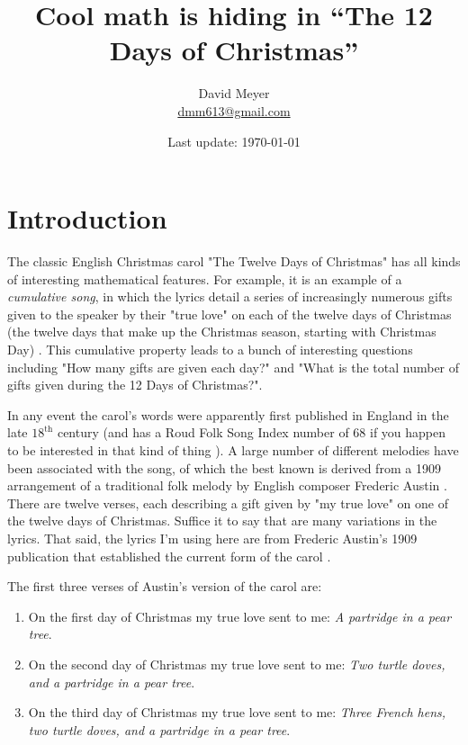 \documentclass{article}
\title{Cool math is hiding in ``The 12 Days of Christmas''}
\author{David Meyer \\ \href{mailto:dmm613@gmail.com}
                            {dmm613@gmail.com}}
\date{Last update: \today}
\theoremstyle{definition}
\begin{document}
\maketitle
%
%
%
\section{Introduction}
\label{sec:introduction}
The classic English Christmas carol "The Twelve Days of
Christmas" has all kinds of interesting mathematical
features. For example, it is an example of a \emph{cumulative
song}, in which the lyrics detail a series of increasingly
numerous gifts given to the speaker by their "true love" on each
of the twelve days of Christmas (the twelve days that make up the
Christmas season, starting with Christmas Day)
\cite{wikipedia:cumulative_song}. This cumulative property leads
to a bunch of interesting questions including "How many gifts are
given each day?" and "What is the total number of gifts given
during the 12 Days of Christmas?".

\bigskip
\noindent
In any event the carol's words were apparently first published in
England in the late $18^{\text{th}}$ century (and has a Roud Folk
Song Index number of 68 if you happen to be interested in that
kind of thing \cite{wikipedia:roud_folk_song_index}). A large
number of different melodies have been associated with the song,
of which the best known is derived from a 1909 arrangement of a
traditional folk melody by English composer Frederic Austin
\cite{wikipedia:twelve_days_of_christmas}.  There are twelve
verses, each describing a gift given by "my true love" on one of
the twelve days of Christmas. Suffice it to say that are many
variations in the lyrics. That said, the lyrics I'm using here
are from Frederic Austin's 1909 publication that established the
current form of the carol \cite{wikipedia:frederic_austin}.

\bigskip
\noindent
The first three verses of Austin's version of the carol are:

\smallskip
\begin{enumerate}
\item On the first day of Christmas my true love sent to me:
\emph{A partridge in a pear tree}.

\item On the second day of Christmas my true love sent to me:
\emph{Two turtle doves, and a partridge in a pear tree}.

\item On the third day of Christmas my true love sent to me:
\emph{Three French hens, two turtle doves, and a partridge in 
a pear tree}.
\end{enumerate}
\end{document}
